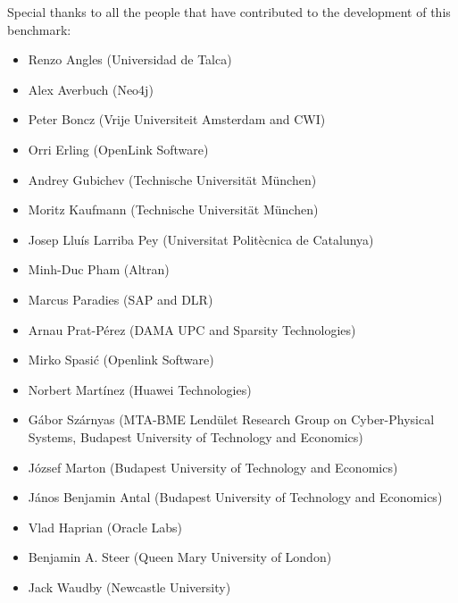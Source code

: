Special thanks to all the people that have contributed to the development of this benchmark:
\begin{itemize}
  \item Renzo Angles (Universidad de Talca)
  \item Alex Averbuch (Neo4j)
  \item Peter Boncz (Vrije Universiteit Amsterdam and CWI)
  \item Orri Erling (OpenLink Software)
  \item Andrey Gubichev (Technische Universit\"at M\"unchen)
  \item Moritz Kaufmann (Technische Universit\"at M\"unchen)
  \item Josep Llu\'is Larriba Pey (Universitat Polit\`ecnica de Catalunya)
  \item Minh-Duc Pham (Altran)
  \item Marcus Paradies (SAP and DLR)
  \item Arnau Prat-P\'erez (DAMA UPC and Sparsity Technologies)
  \item Mirko Spasi\'c (Openlink Software)
  \item Norbert Mart\'inez (Huawei Technologies)
  \item G\'abor Sz\'arnyas (MTA-BME Lend\"ulet Research Group on Cyber-Physical Systems, Budapest University of Technology and Economics)
  \item J\'ozsef Marton (Budapest University of Technology and Economics)
  \item J\'anos Benjamin Antal (Budapest University of Technology and Economics)
  \item Vlad Haprian (Oracle Labs)
  \item Benjamin A. Steer (Queen Mary University of London)
  \item Jack Waudby (Newcastle University)
\end{itemize}
